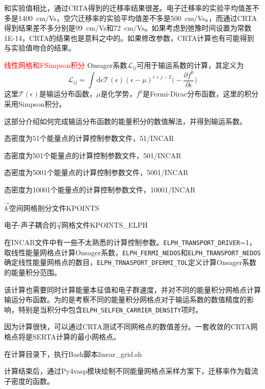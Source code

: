 和实验值相比，通过\textrm{CRTA}得到的迁移率结果很差。电子迁移率的实验平均值差不多是\textrm{1400~cm/Vs}，空穴迁移率的实验平均值差不多是\textrm{500~cm/Vs}。，而通过\textrm{CRTA}得到结果差不多分别是\textrm{99~cm/Vs}和\textrm{72~cm/Vs}。如果考虑到弛豫时间设置为常数\textrm{1E-14}，\textrm{CRTA}的结果也是意料之中的。如果修改参数，\textrm{CRTA}计算也有可能得到与实验值吻合的结果。

\textcolor{red}{线性网格和F\textrm{Simpson}积分}
\textrm{Onsager}系数$\mathcal{L}_{ij}$可用于输运系数的计算，其定义为
\begin{displaymath}
	\mathcal{L}_{ij}=\int\mathrm{d}\epsilon\mathcal{T}(\epsilon)(\epsilon-\mu)^{i+j-2}\bigg(-\dfrac{\partial f^0}{\partial\epsilon}\bigg)
\end{displaymath}
这里$\mathcal{T}(\epsilon)$是输运分布函数，$\mu$是化学势，$f^0$是\textrm{Fermi-Dirac}分布函数，这里的积分采用\textrm{Simpson}积分。

这部分介绍如何完成输运分布函数的能量积分的数值解法，并得到输运系数。

态密度为51个能量点的计算控制参数文件，\textrm{51/INCAR}

态密度为501个能量点的计算控制参数文件，\textrm{501/INCAR}

态密度为5001个能量点的计算控制参数文件，\textrm{5001/INCAR}

态密度为10001个能量点的计算控制参数文件，\textrm{10001/INCAR}

$\vec k$空间网格剖分文件\textrm{KPOINTS}

电子-声子耦合的$\vec q$网格文件\textrm{KPOINTS\_ELPH}

在\textrm{INCAR}文件中有一些不太熟悉的计算控制参数。\texttt{ELPH\_TRANSPORT\_DRIVER}=1，取线性能量网格点计算\textrm{Onsager}系数，\texttt{ELPH\_FERMI\_NEDOS}和\texttt{ELPH\_TRANSPORT\_NEDOS}确定线性能量网格点的数目，\texttt{ELPH\_TRNASPORT\_DFERMI\_TOL}定义计算\textrm{Onsager}系数的能量积分范围。

该计算也需要同时计算能量本征值和电子群速度，并对不同的能量积分网格点计算输运分布函数。为的是考察不同的能量积分网格点对于输运系数的数值精度的影响，特别是当积分中包含\texttt{ELPH\_SELFEN\_CARRIER\_DENSITY}项时。

因为计算很快，可以通过\textrm{CRTA}测试不同网格点的数值差分。一套收敛的\textrm{CRTA}网格点将是\textrm{SERTA}计算的最小网格点。

在计算目录下，执行\textrm{Bash}脚本\textrm{linear\_grid.sh}

计算结束后，通过\textrm{Py4vasp}模块绘制不同能量网格点采样方案下，迁移率作为载流子密度的函数。

